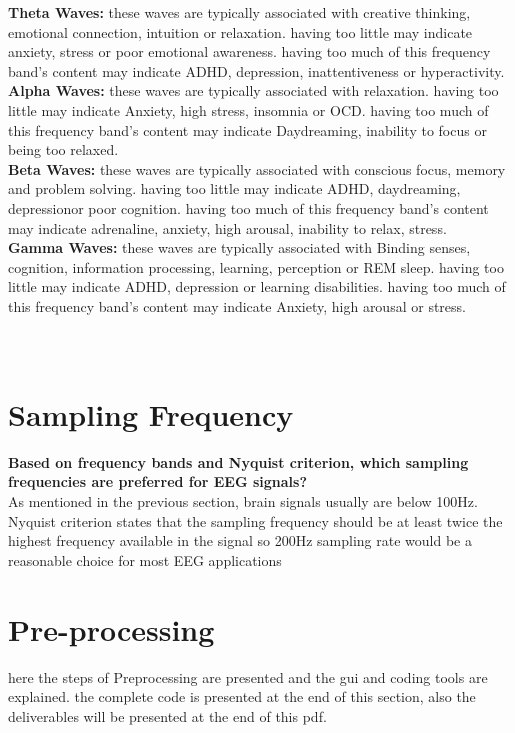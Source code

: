 \documentclass[11pt]{article}
\begin{document}
\textbf{Theta Waves: } these waves are typically associated with creative thinking, 
emotional connection, intuition or relaxation. having too little may indicate anxiety, stress or poor emotional awareness.
having too much of this frequency band's content may indicate ADHD, depression, inattentiveness or hyperactivity. \\

\textbf{Alpha Waves: } these waves are typically associated with relaxation. having too little may indicate Anxiety, high stress, insomnia or OCD.
having too much of this frequency band's content may indicate Daydreaming, inability to focus or being too relaxed. \\

\textbf{Beta Waves: } these waves are typically associated with conscious focus, memory and problem solving. having too little may indicate ADHD, daydreaming, depressionor  poor cognition.
having too much of this frequency band's content may indicate adrenaline, anxiety, high arousal, inability to relax, stress. \\

\textbf{Gamma Waves: } these waves are typically associated with Binding senses, cognition, information processing, learning, perception or REM sleep. 
having too little may indicate ADHD, depression or learning disabilities.
having too much of this frequency band's content may indicate Anxiety, high arousal or stress. \\ \\ \\

\section{Sampling Frequency}
\textbf{Based on frequency bands and Nyquist criterion, which sampling frequencies are preferred
for EEG signals?} \\ 
As mentioned in the previous section, brain signals usually are below 100Hz. Nyquist criterion states
that the sampling frequency should be at least twice the highest frequency
available in the signal so 200Hz sampling rate would be a reasonable choice for most
EEG applications \\

\section{Pre-processing}
here the steps of Preprocessing are presented and the gui and coding tools 
are explained. the complete code is presented at the end of this section, also
the deliverables will be presented at the end of this pdf. \\
\end{document}
